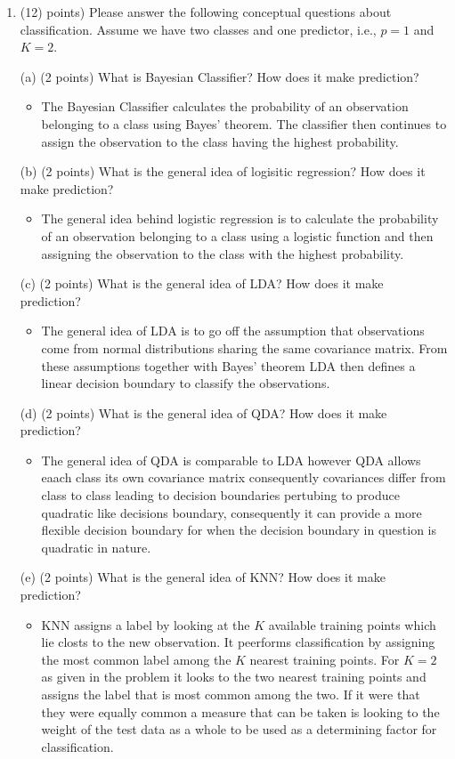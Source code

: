 \documentclass[
]{article}
\begin{document}
\begin{enumerate}
\newpage
\item (12) points) Please answer the following conceptual questions about classification. Assume we have two classes and one predictor, i.e., $p = 1$ and $K = 2$.

(a) (2 points) What is Bayesian Classifier? How does it make prediction?
\begin{itemize}
\item The Bayesian Classifier calculates the probability of an observation belonging to a class using Bayes' theorem. The classifier then continues to assign the observation to the class having the highest probability.
\end{itemize}
(b) (2 points) What is the general idea of logisitic regression? How does it make prediction?
\begin{itemize}
\item The general idea behind logistic regression is to calculate the probability of an observation belonging to a class using a logistic function and then assigning the observation to the class with the highest probability.
\end{itemize}
(c) (2 points) What is the general idea of LDA? How does it make prediction?
\begin{itemize}
\item The general idea of LDA is to go off the assumption that observations come from normal distributions sharing the same covariance matrix. From these assumptions together with Bayes' theorem LDA then defines a linear decision boundary to classify the observations.
\end{itemize}

(d) (2 points) What is the general idea of QDA? How does it make prediction?
\begin{itemize}
\item The general idea of QDA is comparable to LDA however QDA allows eaach class its own covariance matrix consequently covariances differ from class to class leading to decision boundaries pertubing to produce quadratic like decisions boundary, consequently it can provide a more flexible decision boundary for when the decision boundary in question is quadratic in nature.
\end{itemize}
(e) (2 points) What is the general idea of KNN? How does it make prediction?
\begin{itemize}
\item KNN assigns a label by looking at the $K$ available training points which lie closts to the new observation. It peerforms classification by assigning the most common label among the $K$ nearest training points. For $K=2$ as given in the problem it looks to the two nearest training points and assigns the label that is most common among the two. If it were that they were equally common a measure that can be taken is looking to the weight of the test data as a whole to be used as a determining factor for classification.
\end{itemize}


\end{enumerate}
\end{document}

